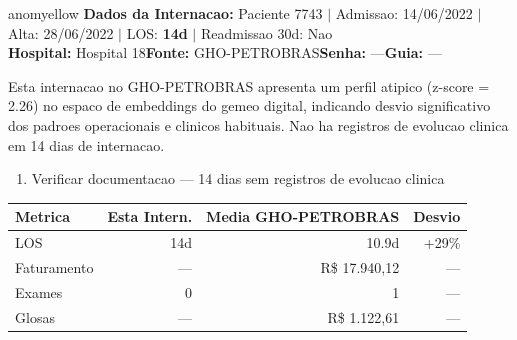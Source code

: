 \documentclass[a4paper,10pt]{article}
\begin{document}
\begin{anomalycard}[Internacao 7721 | GHO-PETROBRAS | MODERADO (z=2.26)]{anomyellow}
\textbf{Dados da Internacao:} Paciente 7743 $\mid$ Admissao: 14/06/2022 $\mid$ Alta: 28/06/2022 $\mid$ LOS: \textbf{14d} $\mid$ Readmissao 30d: Nao\\
\textbf{Hospital:} Hospital 18\quad\textbf{Fonte:} GHO-PETROBRAS\quad\textbf{Senha:} ---\quad\textbf{Guia:} ---\\
\vspace{2pt}\begin{tcolorbox}[colback=severityred!20,colframe=anomyellow,title={\textbf{Interpretacao de Negocio}},fonttitle=\bfseries\small,left=4pt,right=4pt,top=3pt,bottom=3pt]
{\small Esta internacao no GHO-PETROBRAS apresenta um perfil atipico (z-score = 2.26) no espaco de embeddings do gemeo digital, indicando desvio significativo dos padroes operacionais e clinicos habituais. Nao ha registros de evolucao clinica em 14 dias de internacao.}
\end{tcolorbox}
\begin{tcolorbox}[colback=severityyellow!30,colframe=anomorange,title={\textbf{Recomendacoes Especificas}},fonttitle=\bfseries\small,left=4pt,right=4pt,top=3pt,bottom=3pt]
\begin{enumerate}[nosep,leftmargin=16pt]
\item {\small Verificar documentacao --- 14 dias sem registros de evolucao clinica}
\end{enumerate}
\end{tcolorbox}
\begin{center}\begin{tabular}{l r r r}\toprule\textbf{Metrica} & \textbf{Esta Intern.} & \textbf{Media GHO-PETROBRAS} & \textbf{Desvio} \\\midrule
LOS & 14d & 10.9d & +29\% \\
Faturamento & --- & R\$ 17.940,12 & --- \\
Exames & 0 & 1 & --- \\
Glosas & --- & R\$ 1.122,61 & --- \\
\bottomrule\end{tabular}\end{center}


\end{anomalycard}
\end{document}
